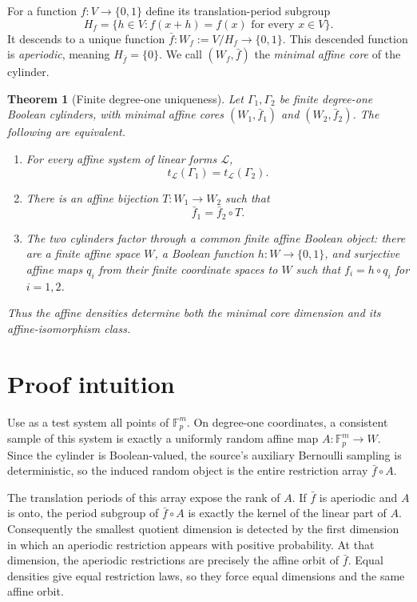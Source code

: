 \documentclass[11pt]{article}
\newtheorem{theorem}{Theorem}
\newcommand{\F}{\mathbb F}
\begin{document}
For a function $f:V\to\{0,1\}$ define its translation-period subgroup
\[
 H_f=\{h\in V:f(x+h)=f(x)\text{ for every }x\in V\}.
\]
It descends to a unique function
$\bar f:W_f:=V/H_f\to\{0,1\}$.  This descended function is
\emph{aperiodic}, meaning $H_{\bar f}=\{0\}$.  We call $(W_f,\bar f)$ the
\emph{minimal affine core} of the cylinder.

\begin{theorem}[Finite degree-one uniqueness]\label{thm:main}
Let $\Gamma_1,\Gamma_2$ be finite degree-one Boolean cylinders, with minimal
affine cores $(W_1,\bar f_1)$ and $(W_2,\bar f_2)$.  The following are
equivalent.
\begin{enumerate}
\item For every affine system of linear forms $\mathcal L$,
\[
 t_{\mathcal L}(\Gamma_1)=t_{\mathcal L}(\Gamma_2).
\]
\item There is an affine bijection $T:W_1\to W_2$ such that
\[
 \bar f_1=\bar f_2\circ T.
\]
\item The two cylinders factor through a common finite affine Boolean object:
there are a finite affine space $W$, a Boolean function $h:W\to\{0,1\}$,
and surjective affine maps $q_i$ from their finite coordinate spaces to $W$
such that $f_i=h\circ q_i$ for $i=1,2$.
\end{enumerate}
Thus the affine densities determine both the minimal core dimension and its
affine-isomorphism class.
\end{theorem}

\section{Proof intuition}

Use as a test system all points of $\F_p^m$.  On degree-one coordinates, a
consistent sample of this system is exactly a uniformly random affine map
$A:\F_p^m\to W$.  Since the cylinder is Boolean-valued, the source's
auxiliary Bernoulli sampling is deterministic, so the induced random object is
the entire restriction array $\bar f\circ A$.

The translation periods of this array expose the rank of $A$.  If $\bar f$ is
aperiodic and $A$ is onto, the period subgroup of $\bar f\circ A$ is exactly
the kernel of the linear part of $A$.  Consequently the smallest quotient
dimension is detected by the first dimension in which an aperiodic restriction
appears with positive probability.  At that dimension, the aperiodic
restrictions are precisely the affine orbit of $\bar f$.  Equal densities
give equal restriction laws, so they force equal dimensions and the same
affine orbit.
\end{document}

